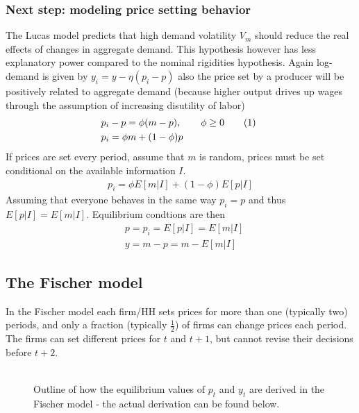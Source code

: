 \documentclass[12pt, a4paper]{article}
\begin{document}
\begin{spacing}{1.213}
\subsubsection{Next step: modeling price setting behavior}
The Lucas model predicts that high demand volatility $V_m$ should reduce the real effects of changes in aggregate demand. This hypothesis however has less explanatory power compared to the nominal rigidities hypothesis. Again log-demand is given by $y_i = y - \eta(p_i - p)$ also the price set by a producer will be positively related to aggregate demand (because higher output drives up wages through the assumption of increasing disutility of labor)
\begin{align*}
&p_i - p = \phi(m - p), \qquad \phi \geq 0
  \stepcounter{equation}\tag{\theequation}\label{eq: phiandy}\
\\
& p_i = \phi m + (1-\phi) p
\end{align*}
If prices are set every period, assume that $m$ is random, prices must be set conditional on the available information $I$.
\begin{align*}
p_i = \phi E[m|I] + (1-\phi) E[p|I]
\end{align*}
Assuming that everyone behaves in the same way $p_i = p$ and thus $E[p|I]= E[m|I]$. Equilibrium condtions are then
\begin{align*}
&p = p_i = E[p|I] = E[m|I] \\
& y = m-p = m- E[m|I]
\end{align*}
\subsection{The Fischer model}
In the Fischer model each firm/HH sets prices for more than one (typically two) periods, and only a fraction (typically $\frac{1}{2}$) of firms can change prices each period. The firms can set different prices for $t$ and $t+1$, but cannot revise their decisions before $t+2$.

\begin{figure}[h]
\caption{}
\centering
\begin{minipage}{0.8\textwidth} %
\def\svgwidth{\columnwidth}

{\footnotesize
\\
Outline of how the equilibrium values of $p_t$ and $y_t$ are derived in the Fischer model - the actual derivation can be found below.
\par}
\end{minipage}
\end{figure}
\FloatBarrier


\end{spacing}
\end{document}
